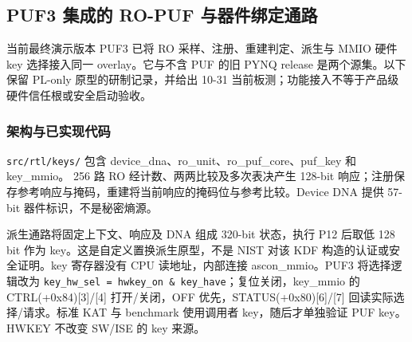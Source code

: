 
\Needspace{85pt}

\subsection{PUF3 集成的 RO-PUF 与器件绑定通路}\label{ux72ecux7acbux6269ux5c55ux539fux578bro-puf-ux4e0eux5668ux4ef6ux7ed1ux5b9aux901aux8def}

当前最终演示版本 PUF3 已将 RO 采样、注册、重建判定、派生与 MMIO 硬件 key 选择接入同一 overlay。它与不含 PUF 的旧 PYNQ release 是两个源集。以下保留 PL-only 原型的研制记录，并给出 10-31 当前板测；功能接入不等于产品级硬件信任根或安全启动验收。

\Needspace{85pt}

\subsubsection{架构与已实现代码}

\texttt{src/\allowbreak{}rtl/\allowbreak{}keys/\allowbreak{}} 包含 device\_dna、ro\_unit、ro\_puf\_core、puf\_key 和 key\_mmio。 256 路 RO 经计数、两两比较及多次表决产生 128-bit 响应；注册保存参考响应与掩码，重建将当前响应的掩码位与参考比较。Device DNA 提供 57-bit 器件标识，不是秘密熵源。

派生通路将固定上下文、响应及 DNA 组成 320-bit 状态，执行 P12 后取低 128 bit 作为 key。这是自定义置换派生原型，不是 NIST 对该 KDF 构造的认证或安全证明。key 寄存器没有 CPU 读地址，内部连接 ascon\_mmio。PUF3 将选择逻辑改为 \texttt{key\_hw\_sel = hwkey\_on \& key\_have}；复位关闭，key\_mmio 的 CTRL(+0x84)[3]/[4] 打开/关闭，OFF 优先，STATUS(+0x80)[6]/[7] 回读实际选择/请求。标准 KAT 与 benchmark 使用调用者 key，随后才单独验证 PUF key。HWKEY 不改变 SW/ISE 的 key 来源。


